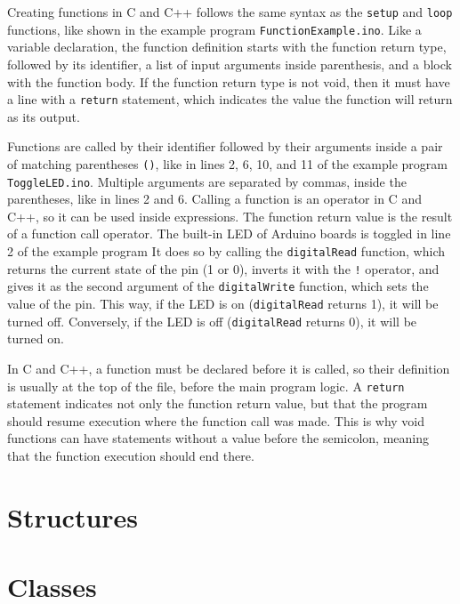 Creating functions in C and C++ follows the same syntax as the \texttt{setup} and \texttt{loop} functions, like shown in the example program \texttt{FunctionExample.ino}.
Like a variable declaration, the function definition starts with the function return type, followed by its identifier, a list of input arguments inside parenthesis, and a block with the function body.
If the function return type is not void, then it must have a line with a \texttt{return} statement, which indicates the value the function will return as its output.

\clearpage
{}

Functions are called by their identifier followed by their arguments inside a pair of matching parentheses \texttt{()}, like in lines 2, 6, 10, and 11 of the example program \texttt{ToggleLED.ino}.
Multiple arguments are separated by commas, inside the parentheses, like in lines 2 and 6.
Calling a function is an operator in C and C++, so it can be used inside expressions.
The function return value is the result of a function call operator.
The built-in LED of Arduino boards is toggled in line 2 of the example program
It does so by calling the \texttt{digitalRead} function, which returns the current state of the pin (1 or 0), inverts it with the \texttt{!} operator, and gives it as the second argument of the \texttt{digitalWrite} function, which sets the value of the pin.
This way, if the LED is on (\texttt{digitalRead} returns 1), it will be turned off.
Conversely, if the LED is off (\texttt{digitalRead} returns 0), it will be turned on.

In C and C++, a function must be declared before it is called, so their definition is usually at the top of the file, before the main program logic.
A \texttt{return} statement indicates not only the function return value, but that the program should resume execution where the function call was made.
This is why void functions can have  statements without a value before the semicolon, meaning that the function execution should end there.

\section{Structures}
\section{Classes}

